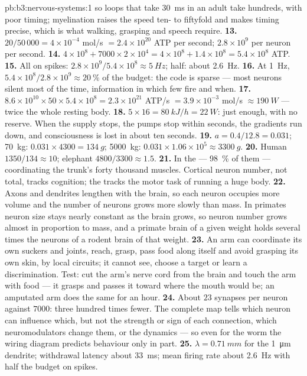 \begin{solution}{pb:b3:nervous-systems:1}
so loops that take \qty{30}{ms} in an adult take hundreds, with poor
timing; myelination raises the speed ten- to fiftyfold and makes timing
precise, which is what walking, grasping and speech require.
\textbf{13.} $20/50\,000 = 4\times 10^{-4}$ mol/s $= 2.4\times 10^{20}$
ATP per second; $2.8\times 10^{9}$ per neuron per second.
\textbf{14.} $4\times 10^{8} + 7000\times 2\times 10^{4} = 4\times 10^{8}
+ 1.4\times 10^{8} = 5.4\times 10^{8}$ ATP.
\textbf{15.} All on spikes: $2.8\times 10^{9}/5.4\times 10^{8} \approx
\qty{5}{Hz}$; half: about \qty{2.6}{Hz}.
\textbf{16.} At \qty{1}{Hz}, $5.4\times 10^{8}/2.8\times 10^{9} \approx
\qty{20}{\%}$ of the budget: the code is sparse --- most neurons silent
most of the time, information in which few fire and when.
\textbf{17.} $8.6\times 10^{10}\times 50\times 5.4\times 10^{8} = 2.3
\times 10^{21}$ ATP/s $= 3.9\times 10^{-3}$ mol/s $\approx \qty{190}{W}$
--- twice the whole resting body.
\textbf{18.} $5\times 16 = \qty{80}{kJ/h} = \qty{22}{W}$: just enough,
with no reserve. When the supply stops, the pumps stop within seconds,
the gradients run down, and consciousness is lost in about ten seconds.
\textbf{19.} $a = 0.4/12.8 = 0.031$; \qty{70}{kg}: $0.031\times 4300 =
\qty{134}{g}$; \qty{5000}{kg}: $0.031\times 1.06\times 10^{5} \approx
\qty{3300}{g}$.
\textbf{20.} Human $1350/134 \approx 10$; elephant $4800/3300 \approx
1.5$.
\textbf{21.} In the  --- \qty{98}{\%} of them --- coordinating
the trunk's forty thousand muscles. Cortical neuron number, not total,
tracks cognition; the  tracks the motor task of running a
huge body.
\textbf{22.} Axons and dendrites lengthen with the brain, so each neuron
occupies more volume and the number of neurons grows more slowly than
mass. In primates neuron size stays nearly constant as the brain grows,
so neuron number grows almost in proportion to mass, and a primate
brain of a given weight holds several times the neurons of a rodent
brain of that weight.
\textbf{23.} An arm can coordinate its own suckers and joints, reach,
grasp, pass food along itself and avoid grasping its own skin, by local
circuits; it cannot see, choose a target or learn a discrimination.
Test: cut the arm's nerve cord from the brain and touch the arm with
food --- it grasps and passes it toward where the mouth would be; an
amputated arm does the same for an hour.
\textbf{24.} About $23$ synapses per neuron against $7000$: three hundred
times fewer. The complete map tells which neuron can influence which,
but not the strength or sign of each connection, which neuromodulators
change them, or the dynamics --- so even for the worm the wiring
diagram predicts behaviour only in part.
\textbf{25.} $\lambda = \qty{0.71}{mm}$ for the \qty{1}{\micro m}
dendrite; withdrawal latency about \qty{33}{ms}; mean firing rate
about \qty{2.6}{Hz} with half the budget on spikes.
\end{solution}
